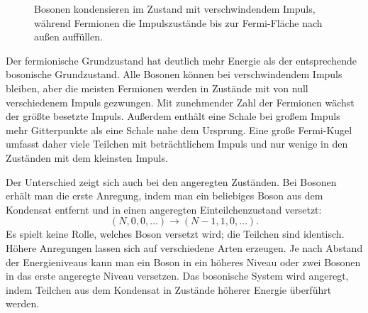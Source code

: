 \begin{figure}
\centering
{}
\caption{Bosonen kondensieren im Zustand mit verschwindendem Impuls, während Fermionen die Impulszustände bis zur Fermi-Fläche nach außen auffüllen.}
\end{figure}

Der fermionische Grundzustand hat deutlich mehr Energie als der entsprechende bosonische Grundzustand. Alle Bosonen können bei verschwindendem Impuls bleiben, aber die meisten Fermionen werden in Zustände mit von null verschiedenem Impuls gezwungen. Mit zunehmender Zahl der Fermionen wächst der größte besetzte Impuls. Außerdem enthält eine Schale bei großem Impuls mehr Gitterpunkte als eine Schale nahe dem Ursprung. Eine große Fermi-Kugel umfasst daher viele Teilchen mit beträchtlichem Impuls und nur wenige in den Zuständen mit dem kleinsten Impuls.

Der Unterschied zeigt sich auch bei den angeregten Zuständen. Bei Bosonen erhält man die erste Anregung, indem man ein beliebiges Boson aus dem Kondensat entfernt und in einen angeregten Einteilchenzustand versetzt:
\begin{equation}
(N,0,0,\ldots)\longrightarrow (N-1,1,0,\ldots).
\end{equation}
Es spielt keine Rolle, welches Boson versetzt wird; die Teilchen sind identisch. Höhere Anregungen lassen sich auf verschiedene Arten erzeugen. Je nach Abstand der Energieniveaus kann man ein Boson in ein höheres Niveau oder zwei Bosonen in das erste angeregte Niveau versetzen. Das bosonische System wird angeregt, indem Teilchen aus dem Kondensat in Zustände höherer Energie überführt werden.

